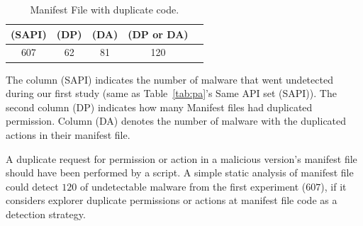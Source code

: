 \begin{table}[ht]
  \caption{Manifest File with duplicate code.}
  \centering
  \begin{small}
 \begin{tabular}{ccccc}
   \toprule
   (SAPI) & (DP) & (DA) & (DP or DA) \\   \midrule
   607 & 62 & 81 & 120 \\ 
   
 \bottomrule
 \end{tabular}
 \end{small}
 \label{tab:mfa}
\end{table}

The column (SAPI) indicates the number of malware that went undetected during our first study (same as Table~\ref{tab:pa}'s Same API set (SAPI)). The second column (DP) indicates how many Manifest files had duplicated permission. Column (DA) denotes the number of malware with the duplicated actions in their manifest file.

A duplicate request for permission or action in a malicious version's manifest file should have been performed by a script. A simple static analysis of manifest file could detect $120$ of undetectable malware from the first experiment ($607$), if it considers explorer duplicate permissions or actions at manifest file code as a detection strategy.

